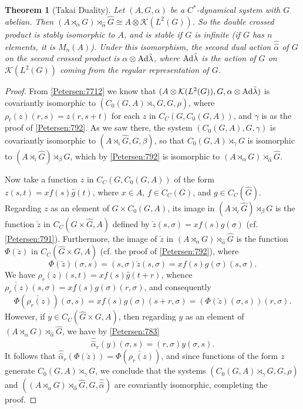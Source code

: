 \documentclass{book}
\newtheorem{theorem}[definition]{Theorem}
\begin{document}
\begin{theorem}[Takai Duality]\label{theorem:Takai}\label{Petersen:793}
  Let \((A, G, \alpha)\) be a \(C^*\)-dynamical system with \(G\) abelian. Then \((A\rtimes_\alpha G)\rtimes_{\hat{\alpha}} \hat{G}\cong A\otimes \mathcal{K}(L^2(G))\).
  So the \textit{double} crossed product is stably isomorphic to \(A\), and is stable if \(G\) is infinite (if \(G\) has \(n\) elements, it is \(M_n(A)\)).
  Under this isomorphism, the second dual action \(\hat{\hat{\alpha}}\) of \(G\) on the second crossed product is \(\alpha\otimes\textnormal{Ad}\tilde{\lambda}\), 
  where \(\textnormal{Ad}\tilde{\lambda}\) is the action of \(G\)
  on \(\mathcal{K}(L^2(G))\) coming from the regular representation of \(G\).
\end{theorem}
\begin{proof}
  From \ref{Petersen:7712} we know that \((A\otimes\mathcal{K}(L^2(G)),G,\alpha\otimes \textnormal{Ad}\tilde{\lambda})\) is covariantly
  isomorphic to \((C_0(G,A)\rtimes_\gamma G,G,\rho)\), where \(\rho_t(z)(r,s)=z(r,s+t)\) for each 
  \(z\) in \(C_C(G,C_0(G,A))\), and \(\gamma\) is as the proof of \ref{Petersen:792}.
  As we saw there, the system \((C_0(G,A),G,\gamma)\) is covariantly isomorphic to \((A\rtimes_\iota\hat{G},G,\beta)\), so that
  \(C_0(G,A)\rtimes_\gamma G\) is isomorphic to \((A\rtimes_\iota\hat{G})\rtimes_\beta G\), which by \ref{Petersen:792} is isomorphic to
  \((A\rtimes_\alpha G)\rtimes_{\hat{\alpha}}\hat{G}\).\par
  Now take a function \(z\) in \(C_C(G,C_0(G,A))\) of the form \(z(s,t)=xf(s)\hat{g}(t)\),
  where \(x\in A\), \(f\in C_C(G)\), and \(g\in C_C(\hat{G})\). Regarding \(z\) as an element of \(G\times C_0(G,A)\), its image
  in \((A\rtimes_\iota\hat{G})\rtimes_\beta G\) is the function \(\check{z}\) in \(C_C(G\times \hat{G},A)\) defined by
  \(\check{z}(s,\sigma)=xf(s)g(\sigma)\) (cf. \ref{Petersen:791}). Furthermore,
  the image of \(\check{z}\) in \((A\rtimes_\alpha G)\rtimes_{\hat{\alpha}}\hat{G}\) is the function \(\Phi(\check{z})\) in \(C_C(\hat{G}\times G,A)\) (cf. the proof of \ref{Petersen:792}), where
  \[
    \Phi(\check{z})(\sigma,s)=(s,\sigma)\check{z}(s,\sigma)=xf(s)g(\sigma)(s,\sigma).
  \]
  We have \(\rho_r(z)(s,t)=xf(s)\hat{g}(t+r)\), whence \(\check{\rho_r(z)}(s,\sigma)=xf(s)g(\sigma)(r,\sigma)\),
  and consequently
  \[
    \Phi(\check{\rho_r(z)})(\sigma,s)=xf(s)g(\sigma)(s+r,\sigma)=(\Phi(\check{z})(\sigma,s))(r,\sigma).
  \]
  However, if \(y\in C_C(\hat{G}\times G,A)\), then regarding \(y\) as an element of \((A\rtimes_\alpha G)\rtimes_{\hat{\alpha}}\hat{G}\), we have by \ref{Petersen:783}
  \[
    \hat{\hat{\alpha}}_r(y)(\sigma,s)=(r,\sigma)y(\sigma,s).
  \]
  It follows that \(\hat{\hat{\alpha}}_r(\Phi(\check{z}))=\Phi(\check{\rho_r(z)})\), and since functions of the form \(z\) generate
  \(C_0(G,A)\rtimes_\gamma G\), we conclude that the systems \((C_0(G,A)\rtimes_\gamma G,G,\rho)\) and 
  \(((A\rtimes_\alpha G)\rtimes_{\hat{\alpha}}\hat{G},G,\hat{\hat{\alpha}})\) are covariantly isomorphic, completing the proof.
\end{proof}
\end{document}
